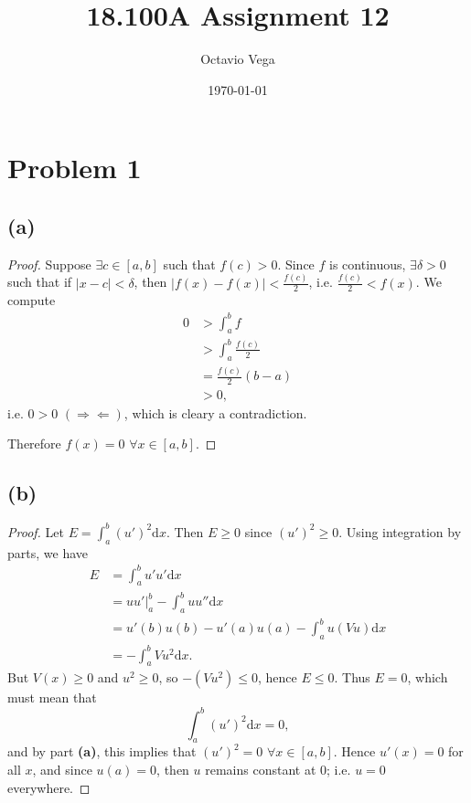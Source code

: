 \documentclass{article}
\title{18.100A Assignment 12}
\author{Octavio Vega}
\date\today
\begin{document}
\maketitle
	
\section*{Problem 1}
\subsection*{(a)}
\begin{proof}
	Suppose $\exists c \in [a, b]$ such that $f(c) > 0$. Since $f$ is continuous, $\exists \delta > 0$ such that if $|x - c| < \delta$, then $|f(x) - f(x)| < \frac{f(c)}{2}$, i.e. $\frac{f(c)}{2} < f(x)$. We compute
	\begin{align}
		0 &> \int_a^b f \\
		&> \int_a ^b \frac{f(c)}{2} \\
		&= \frac{f(c)}{2}(b - a) \\
		&> 0,
	\end{align}
	i.e. $0 > 0$ $(\Rightarrow \Leftarrow)$, which is cleary a contradiction.
	
	Therefore $f(x) = 0$ $\forall x \in [a, b]$.  
\end{proof}

\subsection*{(b)}
\begin{proof}
	Let $E = \int_a ^b (u')^2 \mathrm{d}x$. Then $E \geq 0$ since $(u')^2 \geq 0$. Using integration by parts, we have
	\begin{align}
		E &= \int_a ^b u' u' \mathrm{d}x \\
		&= u u' \big |_a ^b - \int_a ^b u u'' \mathrm{d}x \\
		&= u'(b) u(b) - u'(a) u(a) - \int_a ^b u (V u) \mathrm{d}x \\
		&= - \int_a ^b V u^2 \mathrm{d}x.
	\end{align}
	But $V(x) \geq 0$ and $u^2 \geq 0$, so $-(Vu^2) \leq 0$, hence $E \leq 0$. Thus $E = 0$, which must mean that 
	\begin{equation}
		\int_a ^b (u')^2 \mathrm{d}x = 0,
	\end{equation}
	and by part \textbf{(a)}, this implies that $(u')^2 = 0$  $\forall x \in [a, b]$. Hence $u'(x) = 0$ for all $x$, and since $u(a) = 0$, then $u$ remains constant at $0$; i.e. $u = 0$ everywhere.
\end{proof}
	
\end{document}
